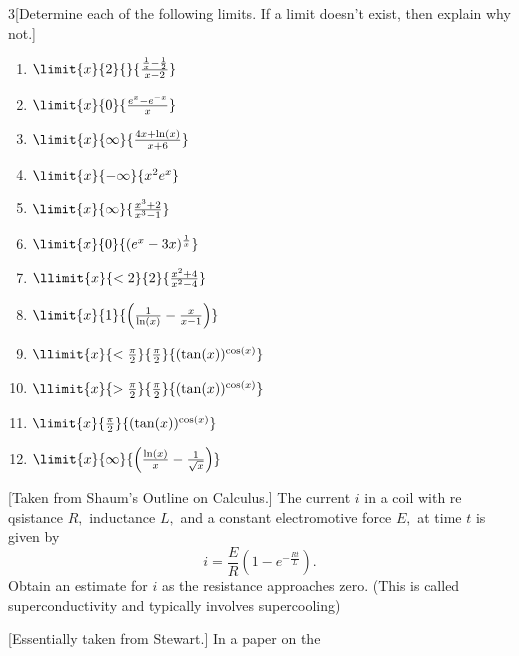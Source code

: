     \begin{ProblemSection}
      \begin{embeddedproblem}{}
        \begin{multicols}{3}[Determine each of the following limits. If a limit doesn't exist, then explain why not.]
          \begin{enumerate}[label={\bf{}(\alph*)}]
          \item $\limit{x}{2}{}{\frac{\frac1x-\frac12}{x-2}}$
          \item $\limit{x}{0}{\frac{e^x-e^{-x}}{x}}$
          \item $\limit{x}{\infty}{\frac{4x+\ln(x)}{x+6}}$
          \item $\limit{x}{-\infty}{x^2e^x}$
          \item $\limit{x}{\infty}{\frac{x^3+2}{x^3-1}}$
          \item $\limit{x}{0}{(e^x-3x)^{\frac1x}}$
          \item $\llimit{x}{<2}{2}{\frac{x^2+4}{x^2-4}}$
          \item $\limit{x}{1}{
              \left(
                \frac{1}{\ln(x)}-\frac{x}{x-1}
              \right)}$
          \item $\llimit{x}{<\frac{\pi}{2}} {\frac{\pi}{2}} {(\tan(x))^{\cos(x)}}$
          \item
            $\llimit{x}{>\frac{\pi}{2}} {\frac{\pi}{2}} {(\tan(x))^{\cos(x)}}$
          \item $\limit{x}{\frac{\pi}{2}}{(\tan(x))^{\cos(x)}}$
          \item $\limit{x}{\infty}{
              \left(
                \frac{\ln(x)}{x}-\frac{1}{\sqrt{x}}
              \right)}$
          \end{enumerate}
        \end{multicols}
      \end{embeddedproblem}
      \begin{embeddedproblem}{}
        [Taken from Shaum's Outline on Calculus.]  The current $i$ in
        a coil with re qsistance $R,$ inductance $L,$ and a constant
        electromotive force $E,$ at time $t$ is given by
        $$
        i=\frac{E}{R}\left(1-e^{-\frac{Rt}{L}} \right).
        $$
        Obtain an estimate for $i$ as the resistance approaches
        zero. (This is called superconductivity and typically involves
        supercooling)
      \end{embeddedproblem}
      \begin{embeddedproblem}{}
        [Essentially taken from Stewart.]  In a paper on the

\end{embeddedproblem}
\end{ProblemSection}
